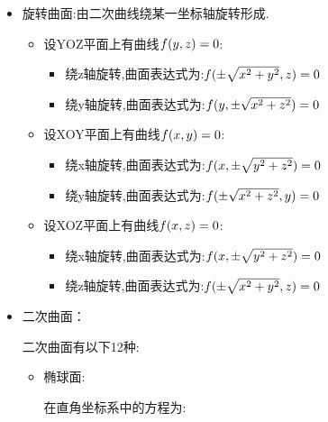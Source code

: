 {{{      \begin{itemize}
        \item {
              旋转曲面:由二次曲线绕某一坐标轴旋转形成.

              \begin{itemize}
                \item {
                      设YOZ平面上有曲线$f(y,z) = 0$:

                      \begin{itemize}
                        \item 绕z轴旋转,曲面表达式为:$f(\pm\sqrt{x^2 + y^2},z) = 0$
                        \item 绕y轴旋转,曲面表达式为:$f(y,\pm\sqrt{x^2 + z^2}) = 0$
                      \end{itemize}
                      }
                \item {
                      设XOY平面上有曲线$f(x,y) = 0$:

                      \begin{itemize}
                        \item 绕x轴旋转,曲面表达式为:$f(x,\pm\sqrt{y^2 + z^2}) = 0$
                        \item 绕y轴旋转,曲面表达式为:$f(\pm\sqrt{x^2 + z^2},y) = 0$
                      \end{itemize}
                      }
                \item {
                      设XOZ平面上有曲线$f(x,z) = 0$:

                      \begin{itemize}
                        \item 绕x轴旋转,曲面表达式为:$f(x,\pm\sqrt{y^2 + z^2}) = 0$
                        \item 绕z轴旋转,曲面表达式为:$f(\pm\sqrt{x^2 + y^2},z) = 0$
                      \end{itemize}
                      }
              \end{itemize}
              }
        \item {
              二次曲面：

              二次曲面有以下12种:
              \begin{itemize}
                \item {
                      椭球面:

                      在直角坐标系中的方程为:

}
\end{itemize}}
\end{itemize}}}}
